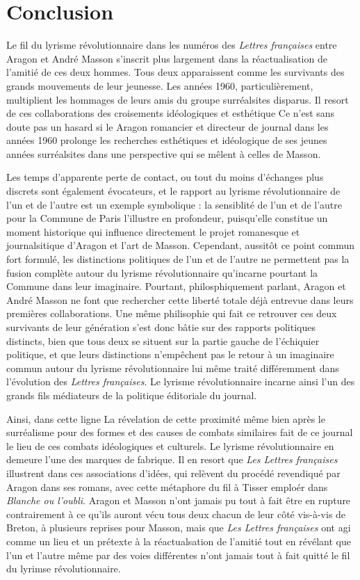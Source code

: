 \chapter*{Conclusion} 
Le fil du lyrisme révolutionnaire dans les numéros des \emph{Lettres françaises} entre Aragon et André Masson s'inscrit plus largement dans la réactualisation de l'amitié de ces deux hommes. Tous deux apparaissent comme les survivants des grands mouvements de leur jeunesse. Les années 1960, particulièrement, multiplient les hommages de leurs amis du groupe surréalsites disparus. Il resort de ces collaborations des croisements idéologiques et esthétique Ce n'est sans doute pas un hasard si le Aragon romancier et directeur de journal dans les années 1960 prolonge les recherches esthétiques et idéologique de ses jeunes années surréalsites dans une perspective qui se mêlent à celles de Masson. 

Les temps d'apparente perte de contact, ou tout du moins d'échanges plus discrets sont également évocateurs, et le rapport au lyrisme révolutionnaire de l'un et de l'autre est un exemple symbolique : la sensiblité de l'un et de l'autre pour la Commune de Paris l'illustre en profondeur, puisqu'elle constitue un moment historique qui influence directement le projet romanesque et journalsitique d'Aragon et l'art de Masson. Cependant, aussitôt ce point commun fort formulé, les distinctions politiques de l'un et de l'autre ne permettent pas la fusion complète autour du lyrisme révolutionnaire qu'incarne pourtant la Commune dans leur imaginaire. Pourtant, philosphiquement parlant, Aragon et André Masson ne font que rechercher cette liberté totale déjà entrevue dans leurs premières collaborations. Une même philisophie qui fait ce retrouver ces deux survivants de leur génération s'est donc bâtie sur des rapports politiques distincts, bien que tous deux se situent sur la partie gauche de l'échiquier politique, et que leurs distinctions n'empêchent pas le retour à un imaginaire commun autour du lyrisme révolutionnaire lui même traité différemment dans l'évolution des \emph{Lettres françaises}. Le lyrisme révolutionnaire incarne ainsi l'un des grands fils médiateurs de la politique éditoriale du journal.

Ainsi, dans cette ligne La révelation de cette proximité même bien après le surréalisme pour des formes et des causes de combats similaires  fait de ce journal le lieu de ces combats idéologiques et culturels. Le lyrisme révolutionnaire en demeure l'une des marques de fabrique. Il en resort que \emph{Les Lettres françaises} illustrent dans ces associations d'idées, qui relèvent du procédé revendiqué par Aragon dans ses romans, avec cette métaphore du fil à Tisser emploér dans \emph{Blanche ou l'oubli}. Aragon et Masson n'ont jamais pu tout à fait être en rupture contrairement à ce qu'ils auront vécu tous deux chacun de leur côté vis-à-vis de Breton, à plusieurs reprises pour Masson, mais que \emph{Les Lettres françaises} ont agi comme un lieu et un prétexte à la réactualsation de l'amitié tout en révélant que l'un et l'autre même par des voies différentes n'ont jamais tout à fait quitté le fil du lyrimse révolutionnaire. 


